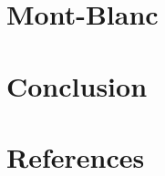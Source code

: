 \documentclass[final, paper=letter,5p,times,twocolumn]{elsarticle}
\begin{document}
\section{Mont-Blanc}

\lipsum[40-43]

\section{Conclusion}

\lipsum[6-10]

\section*{References}



\end{document}
